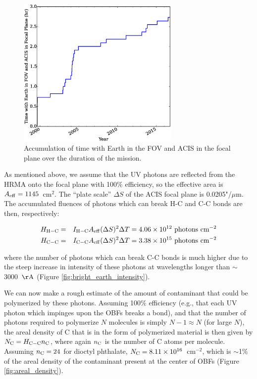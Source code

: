 \documentclass[11pt]{article}
\begin{document}
\begin{figure}
\begin{center}
\includegraphics[width=0.7\textwidth]{time_accum.eps}
\caption{Accumulation of time with Earth in the FOV and ACIS in the focal plane over the duration of the mission.\label{fig:time_accum}}
\end{center}
\end{figure}

As mentioned above, we assume that the UV photons are reflected from the HRMA onto the focal plane with 100\% efficiency,
so the effective area is $A_{\rm eff} = 1145$~cm$^2$. The ``plate scale'' $\Delta{S}$ of the ACIS focal plane is 0.0205"/$\mu$m.
The accumulated fluences of photons which can break H-C and C-C bonds are then, respectively:

\begin{eqnarray}
H_{\rm H-C} &=& I_{\rm H-C}A_{\rm eff}(\Delta{S})^2\Delta{T} = 4.06 \times 10^{12}~{\rm photons~cm^{-2}} \\
H_{\rm C-C} &=& I_{\rm C-C}A_{\rm eff}(\Delta{S})^2\Delta{T} = 3.38 \times 10^{15}~{\rm photons~cm^{-2}}\label{eqn:fluence}
\end{eqnarray}

\noindent
where the number of photons which can break C-C bonds is much higher due to the steep increase in intensity of these photons
at wavelengths longer than $\sim$3000~${\rm \AA}$ (Figure \ref{fig:bright_earth_intensity}).

We can now make a rough estimate of the amount of contaminant that could be polymerized by these photons. Assuming 100\%
efficiency (e.g., that each UV photon which impinges upon the OBFs breaks a bond), and that the number of photons required
to polymerize $N$ molecules is simply $N-1 \approx N$ (for large $N$), the areal density of C that is in the form of
polymerized material is then given by $N_{\rm C} = H_{\rm C-C}n_{\rm C}$, where again $n_{\rm C}$ is the number of C atoms per
molecule. Assuming $n_{\rm C} = 24$ for dioctyl phthalate, $N_{\rm C} = 8.11 \times 10^{16}$~cm$^{-2}$, which is $\sim$1\%
of the areal density of the contaminant present at the center of OBFs (Figure \ref{fig:areal_density}).
\end{document}

